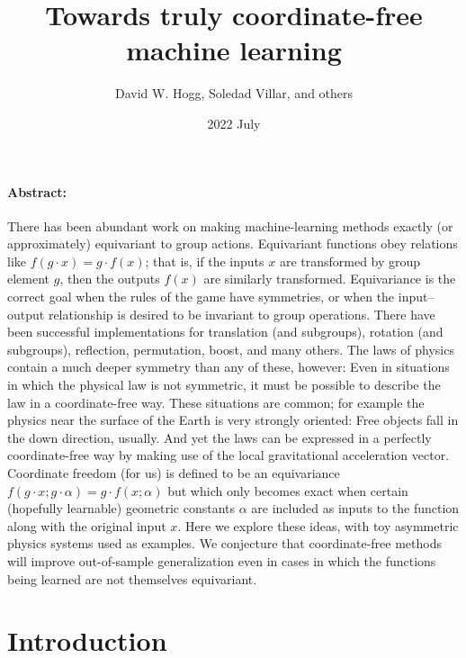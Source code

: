 \documentclass[12pt]{article}
\title{\bfseries%
  Towards truly coordinate-free\\ machine learning}
\author{%
  David W. Hogg, 
  Soledad Villar, and
  others}
\date{2022 July}
\begin{document}
\maketitle\thispagestyle{empty}

\paragraph{Abstract:}
There has been abundant work on making machine-learning methods exactly (or approximately) equivariant to group actions.
Equivariant functions obey relations like $f(g\cdot x) = g\cdot f(x)$; that is, if the inputs $x$ are transformed by group element $g$, then the outputs $f(x)$ are similarly transformed.
Equivariance is the correct goal when the rules of the game have symmetries, or when the input--output relationship is desired to be invariant to group operations.
There have been successful implementations for translation (and subgroups), rotation (and subgroups), reflection, permutation, boost, and many others.
The laws of physics contain a much deeper symmetry than any of these, however:
Even in situations in which the physical law is not symmetric, it must be possible to describe the law in a coordinate-free way.
These situations are common; for example the physics near the surface of the Earth is very strongly oriented:
Free objects fall in the down direction, usually.
And yet the laws can be expressed in a perfectly coordinate-free way by making use of the local gravitational acceleration vector.
Coordinate freedom (for us) is defined to be an equivariance $f(g\cdot x; g\cdot\alpha)=g\cdot f(x; \alpha)$ but which only becomes exact when certain (hopefully learnable) geometric constants $\alpha$ are included as inputs to the function along with the original input $x$.
Here we explore these ideas, with toy asymmetric physics systems used as examples.
We conjecture that coordinate-free methods will improve out-of-sample generalization even in cases in which the functions being learned are not themselves equivariant.

\section{Introduction}
\end{document}
